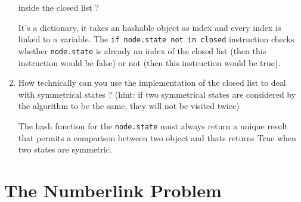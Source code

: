 \begin{enumerate}
        inside the closed list ?
        \begin{framed}
            It's a dictionary, it takes an hashable object as index and
            every index is linked to a variable. The \verb#if node.state not in closed#
            instruction checks whether \verb#node.state# is already an
            index of the closed list (then this instruction would be
            false) or not (then this instruction would be true).
        \end{framed}
    \item How technically can you use the implementation of the closed
        list to deal with symmetrical states ? (hint: if two symmetrical
        states are considered by the algorithm to be the same, they will
        not be visited twice)
        \begin{framed}
            The hash function for the \verb#node.state# must always return
            a unique result that permits a comparison between two object
            and thats returns True when two states are symmetric.
        \end{framed}
\end{enumerate}

\section{The Numberlink Problem}

